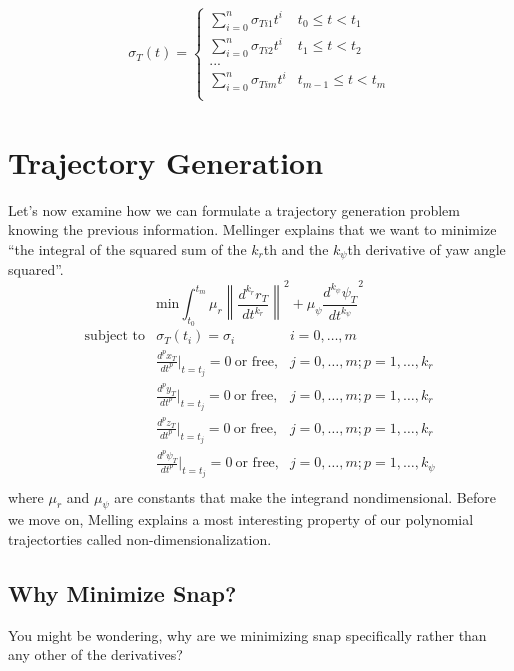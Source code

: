 \documentclass{article}
\newcommand{\norm}[1]{\left\lVert#1\right\rVert}
\begin{document}
\begin{align}\label{eq:polynomial}
\sigma_T(t) =
\left\{
	\begin{array}{ll}
		\sum_{i=0}^n \sigma_{Ti1} t^i  & t_0 \leq t < t_1 \\
		\sum_{i=0}^n \sigma_{Ti2} t^i  & t_1 \leq t < t_2 \\
		... \\
		\sum_{i=0}^n \sigma_{Tim} t^i  & t_{m-1} \leq t < t_m \\
	\end{array}
\right.
\end{align}

\section{Trajectory Generation}

Let's now examine how we can formulate a trajectory generation problem knowing the previous information. Mellinger explains that we want to minimize ``the integral of the squared sum of the $k_r$th and the $k_\psi$th derivative of yaw angle squared''.
\[
\text{min} \int_{t_0}^{t_m} \mu_r \norm{\frac{d^{k_r} r_T}{dt^{k_r}}}^2 + \mu_\psi \frac{d^{k_\psi} \psi_T}{dt^{k_\psi}}^2
\]
\[
	\begin{array}{lll}
		\text{subject to} & \sigma_T(t_i) = \sigma_i & i = 0, \ldots, m\\
		& \frac{d^p x_T}{dt^p}|_{t=t_j} = 0\ \text{or free,} & j = 0, \ldots, m; p = 1, \ldots, k_r\\
		& \frac{d^p y_T}{dt^p}|_{t=t_j} = 0\ \text{or free,} & j = 0, \ldots, m; p = 1, \ldots, k_r\\
		& \frac{d^p z_T}{dt^p}|_{t=t_j} = 0\ \text{or free,} & j = 0, \ldots, m; p = 1, \ldots, k_r\\
		& \frac{d^p \psi_T}{dt^p}|_{t=t_j} = 0\ \text{or free,} & j = 0, \ldots, m; p = 1, \ldots, k_\psi\\
	\end{array}
\]
where $\mu_r$ and $\mu_\psi$ are constants that make the integrand nondimensional. Before we move on, Melling explains a most interesting property of our polynomial trajectorties called non-dimensionalization.

\subsection{Why Minimize Snap?}
You might be wondering, why are we minimizing snap specifically rather than any other of the derivatives? 
\end{document}
